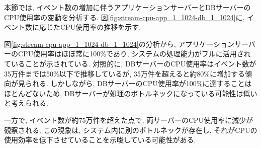 \documentclass[../../../../../../main]{subfiles}
\begin{document}
    \label{subsubsubsec:result-streaming-only-limit-cpu}

    本節では, イベント数の増加に伴うアプリケーションサーバーとDBサーバーのCPU使用率の変動を分析する. 図\ref{fig:stream-cpu-app_1_1024-db_1_1024}に, イベント数に応じたCPU使用率の推移を示す.

    

    図\ref{fig:stream-cpu-app_1_1024-db_1_1024}の分析から, アプリケーションサーバーのCPU使用率はほぼ常に100\%であり, システムの処理能力がフルに活用されていることが示されている. 対照的に, DBサーバーのCPU使用率はイベント数が35万件までは50\%以下で推移しているが, 35万件を超えると約80\%に増加する傾向が見られる. しかしながら, DBサーバーのCPU使用率が100\%に達することはほとんどないため, DBサーバーが処理のボトルネックになっている可能性は低いと考えられる.

    一方で, イベント数が約75万件を超えた点で, 両サーバーのCPU使用率に減少が観察される. この現象は, システム内に別のボトルネックが存在し, それがCPUの使用効率を低下させていることを示唆している可能性がある.
\end{document}
